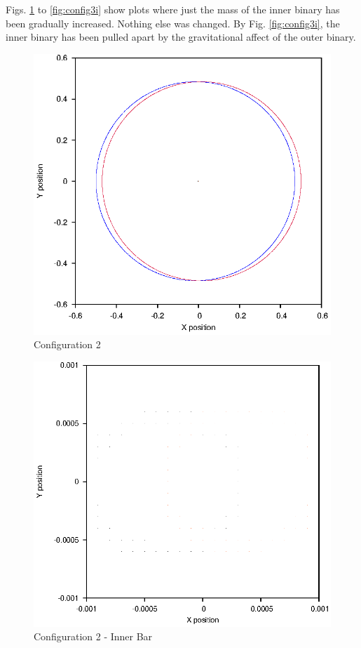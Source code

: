 \documentclass[a4paper,12pt]{article}
\begin{document}
Figs. \ref{fig:config2} to \ref{fig:config3i} show plots where just the mass of the inner binary has been gradually increased. Nothing else was changed.
By Fig. \ref{fig:config3i}, the inner binary has been pulled apart by the gravitational affect of the outer binary.
\begin{figure}[H]
\centering
\includegraphics[width=.9\textwidth]{./2016results/002-5-001/Orbit.eps}
\caption{Configuration 2}
\label{fig:config2}
\end{figure}
\begin{figure}[H]
\centering
\includegraphics[width=.9\textwidth]{./2016results/002-5-001/Inner.eps}
\caption{Configuration 2 - Inner Bar}
\label{fig:config2i}
\end{figure}
\end{document}
